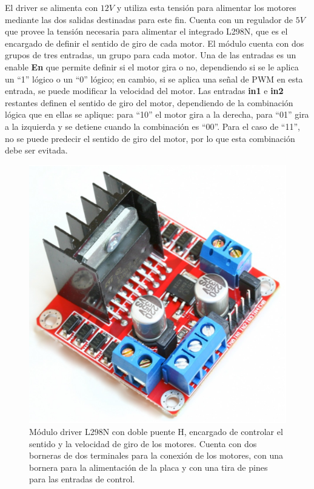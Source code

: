\documentclass[conference,a4paper,9pt]{IEEEtran}
\begin{document}
El driver se alimenta con $12 V$ y utiliza esta tensión para alimentar los motores mediante las dos salidas destinadas para este fin. Cuenta con un regulador de $5V$ que provee la tensión necesaria para alimentar el integrado L298N, que es el encargado de definir el sentido de giro de cada motor. El módulo cuenta con dos grupos de tres entradas, un grupo para cada motor. Una de las entradas es un enable \textbf{En} que permite definir si el motor gira o no, dependiendo si se le aplica un ``1'' lógico o un ``0'' lógico; en cambio, si se aplica una señal de PWM en esta entrada, se puede modificar la velocidad del motor. Las entradas \textbf{in1} e \textbf{in2} restantes definen el sentido de giro del motor, dependiendo de la combinación lógica que en ellas se aplique: para ``10'' el motor gira a la derecha, para ``01'' gira a la izquierda y se detiene cuando la combinación es ``00''. Para el caso de ``11'', no se puede predecir el sentido de giro del motor, por lo que esta combinación debe ser evitada.

\begin{figure}[H]%
\centering\includegraphics[scale=0.9]{driver_motores.eps}%
\caption{Módulo driver L298N con doble puente H, encargado de controlar el sentido y la velocidad de giro de los motores. Cuenta con dos borneras de dos terminales para la conexión de los motores, con una bornera para la alimentación de la placa y con una tira de pines para las entradas de control.}%
\label{driver_motores}%
\end{figure}
\end{document}
